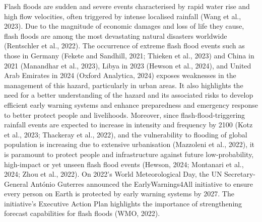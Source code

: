\documentclass[nhess, manuscript]{copernicus}
\begin{document}
\introduction  
Flash floods are sudden and severe events characterised by rapid water rise and high flow velocities, often triggered by intense localised rainfall (Wang et al., 2023). Due to the magnitude of economic damages and loss of life they cause, flash floods are among the most devastating natural disasters worldwide (Rentschler et al., 2022). The occurrence of extreme flash flood events such as those in Germany (Fekete and Sandhill, 2021; Thieken et al., 2023) and China in 2021 (Manandhar et al., 2023), Libya in 2023 (Hewson et al., 2024), and United Arab Emirates in 2024 (Oxford Analytica, 2024) exposes weaknesses in the management of this hazard, particularly in urban areas. It also highlights the need for a better understanding of the hazard and its associated risks to develop efficient early warning systems and enhance preparedness and emergency response to better protect people and livelihoods. Moreover, since flash-flood-triggering rainfall events are expected to increase in intensity and frequency by 2100 (Kotz et al., 2023; Thackeray et al., 2022), and the vulnerability to flooding of global population is increasing due to extensive urbanisation (Mazzoleni et al., 2022), it is paramount to protect people and infrastructure against future low-probability, high-impact or yet unseen flash flood events (Hewson, 2024; Montanari et al., 2024; Zhou et al., 2022). On 2022’s World Meteorological Day, the UN Secretary-General António Guterres announced the EarlyWarnings4All initiative to ensure every person on Earth is protected by early warning systems by 2027. The initiative’s Executive Action Plan highlights the importance of strengthening forecast capabilities for flash floods (WMO, 2022). 
\end{document}
